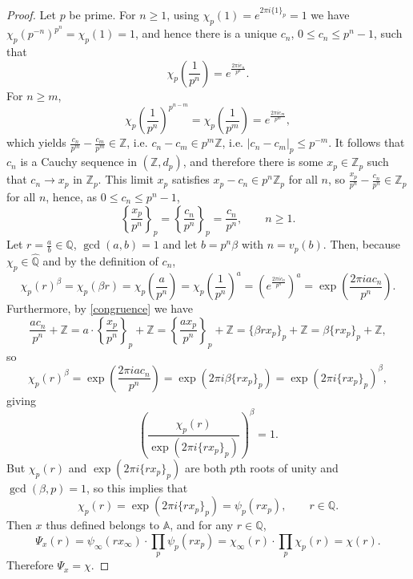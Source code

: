 \documentclass{article}
\theoremstyle{definition}
\theoremstyle{definition}
\begin{document}
\begin{proof}
Let $p$ be prime. For $n \geq 1$, using $\chi_p(1)=e^{2\pi i\{1\}_p}=1$ we have
$\chi_p(p^{-n})^{p^n} = \chi_p(1)=1$, and hence there is a unique
$c_n$, $0 \leq c_n \leq p^n-1$, such that
\[
\chi_p\left(\frac{1}{p^{n}}\right)=e^{\frac{2\pi i c_n}{p^n}}.
\]
For $n \geq m$,
\[
\chi_p\left(\frac{1}{p^{n}}\right)^{p^{n-m}} = \chi_p\left(\frac{1}{p^{m}}\right) = e^{\frac{2\pi i c_m}{p^m}},
\]
which yields $\frac{c_n}{p^m} - \frac{c_m}{p^m} \in \mathbb{Z}$, i.e. 
$c_n -c_m \in p^m \mathbb{Z}$, i.e. 
$|c_n-c_m|_p \leq p^{-m}$.
It follows that $c_n$ is a Cauchy sequence in $(\mathbb{Z},d_p)$, and therefore there is some
$x_p \in \mathbb{Z}_p$ such that  $c_n \to x_p$ in $\mathbb{Z}_p$. This limit $x_p$ satisfies
$x_p-c_n \in p^n \mathbb{Z}_p$ for all $n$, so $\frac{x_p}{p^n}-\frac{c_n}{p^n} \in \mathbb{Z}_p$
for all $n$, hence, as $0 \leq c_n \leq p^n-1$,
\begin{equation}
\left\{ \frac{x_p}{p^n} \right\}_p = \left\{ \frac{c_n}{p^n} \right\}_p=\frac{c_n}{p^n}, \qquad
n \geq 1.
\label{congruence}
\end{equation}                                         
Let $r=\frac{a}{b} \in \mathbb{Q}$, $\gcd(a,b)=1$ and let $b=p^n \beta$ with
$n=v_p(b)$. Then, because $\chi_p \in \widehat{\mathbb{Q}}$ and by the definition of $c_n$,
\[
\chi_p(r)^\beta = \chi_p(\beta r) = \chi_p\left( \frac{a}{p^n} \right) = 
\chi_p\left(\frac{1}{p^n} \right)^a= \left( e^{\frac{2\pi i c_n}{p^n}} \right)^a= 
\exp\left( \frac{2\pi i a c_n}{p^n} \right).
\]
Furthermore, by \eqref{congruence} we have
\[
\frac{ac_n}{p^n} +\mathbb{Z}= a\cdot \left\{\frac{x_p}{p^n} \right\}_p +\mathbb{Z}=
 \left\{ \frac{ax_p}{p^n} \right\}_p +\mathbb{Z}
= \{ \beta rx_p  \}_p +\mathbb{Z}= 
\beta \{rx_p\}_p + \mathbb{Z},
\]
so
\[
\chi_p(r)^\beta=
\exp\left( \frac{2\pi i a c_n}{p^n} \right)
=\exp(2\pi i \beta \{rx_p\}_p)
=\exp(2\pi i \{rx_p\}_p)^\beta,
\]
giving
\[
\left( \frac{\chi_p(r)}{\exp(2\pi i\{rx_p\}_p)} \right)^\beta=1.
\]
But $\chi_p(r)$ and $\exp(2\pi i\{rx_p\}_p)$ are both $p$th roots of unity and $\gcd(\beta,p)=1$, so this implies that
\[
\chi_p(r)=\exp(2\pi i\{rx_p\}_p) = \psi_p(rx_p), \qquad r \in \mathbb{Q}.
\]
Then $x$ thus defined belongs to $\mathbb{A}$, and for any $r \in \mathbb{Q}$,
\[
\Psi_x(r) = \psi_\infty(rx_\infty) \cdot \prod_p \psi_p(rx_p)
=\chi_\infty(r) \cdot \prod_p \chi_p(r)
=\chi(r).
\]
Therefore $\Psi_x = \chi$. 


\end{proof}
\end{document}
